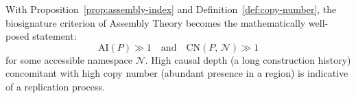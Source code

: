 \begin{remark}
With Proposition~\ref{prop:assembly-index} and
Definition~\ref{def:copy-number}, the biosignature criterion of
Assembly Theory becomes the mathematically well-posed statement:
\[
  \mathrm{AI}(P) \gg 1 \quad \text{and} \quad
  \mathrm{CN}(P,\,\mathcal{N}) \gg 1
\]
for some accessible namespace $\mathcal{N}$.
High causal depth (a long construction history) concomitant with
high copy number (abundant presence in a region) is indicative
of a replication process.
\end{remark}

